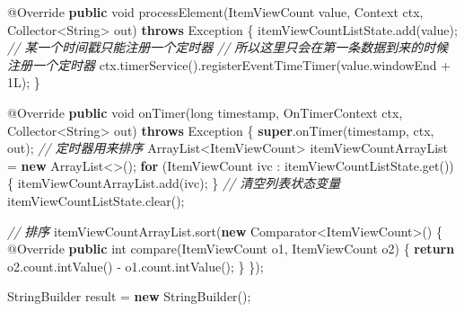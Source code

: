 \documentclass[cn,11pt,chinese]{elegantbook}
\newenvironment{Shaded}{}{}
\newcommand{\AttributeTok}[1]{\textcolor[rgb]{0.49,0.56,0.16}{#1}}
\newcommand{\BuiltInTok}[1]{#1}
\newcommand{\CommentTok}[1]{\textcolor[rgb]{0.38,0.63,0.69}{\textit{#1}}}
\newcommand{\DataTypeTok}[1]{\textcolor[rgb]{0.56,0.13,0.00}{#1}}
\newcommand{\DecValTok}[1]{\textcolor[rgb]{0.25,0.63,0.44}{#1}}
\newcommand{\FunctionTok}[1]{\textcolor[rgb]{0.02,0.16,0.49}{#1}}
\newcommand{\KeywordTok}[1]{\textcolor[rgb]{0.00,0.44,0.13}{\textbf{#1}}}
\newcommand{\NormalTok}[1]{#1}
\begin{document}
\begin{Shaded}
\begin{Highlighting}[]
        \AttributeTok{@Override}
        \KeywordTok{public} \DataTypeTok{void} \FunctionTok{processElement}\NormalTok{(ItemViewCount value, }\BuiltInTok{Context}\NormalTok{ ctx, Collector\textless{}}\BuiltInTok{String}\NormalTok{\textgreater{} out) }\KeywordTok{throws} \BuiltInTok{Exception}\NormalTok{ \{}
\NormalTok{            itemViewCountListState.}\FunctionTok{add}\NormalTok{(value);}
            \CommentTok{// 某一个时间戳只能注册一个定时器}
            \CommentTok{// 所以这里只会在第一条数据到来的时候注册一个定时器}
\NormalTok{            ctx.}\FunctionTok{timerService}\NormalTok{().}\FunctionTok{registerEventTimeTimer}\NormalTok{(value.}\FunctionTok{windowEnd}\NormalTok{ + }\DecValTok{1L}\NormalTok{);}
\NormalTok{        \}}

        \AttributeTok{@Override}
        \KeywordTok{public} \DataTypeTok{void} \FunctionTok{onTimer}\NormalTok{(}\DataTypeTok{long}\NormalTok{ timestamp, OnTimerContext ctx, Collector\textless{}}\BuiltInTok{String}\NormalTok{\textgreater{} out) }\KeywordTok{throws} \BuiltInTok{Exception}\NormalTok{ \{}
            \KeywordTok{super}\NormalTok{.}\FunctionTok{onTimer}\NormalTok{(timestamp, ctx, out);}
            \CommentTok{// 定时器用来排序}
            \BuiltInTok{ArrayList}\NormalTok{\textless{}ItemViewCount\textgreater{} itemViewCountArrayList = }\KeywordTok{new} \BuiltInTok{ArrayList}\NormalTok{\textless{}\textgreater{}();}
            \KeywordTok{for}\NormalTok{ (ItemViewCount ivc : itemViewCountListState.}\FunctionTok{get}\NormalTok{()) \{}
\NormalTok{                itemViewCountArrayList.}\FunctionTok{add}\NormalTok{(ivc);}
\NormalTok{            \}}
            \CommentTok{// 清空列表状态变量}
\NormalTok{            itemViewCountListState.}\FunctionTok{clear}\NormalTok{();}

            \CommentTok{// 排序}
\NormalTok{            itemViewCountArrayList.}\FunctionTok{sort}\NormalTok{(}\KeywordTok{new} \BuiltInTok{Comparator}\NormalTok{\textless{}ItemViewCount\textgreater{}() \{}
                \AttributeTok{@Override}
                \KeywordTok{public} \DataTypeTok{int} \FunctionTok{compare}\NormalTok{(ItemViewCount o1, ItemViewCount o2) \{}
                    \KeywordTok{return}\NormalTok{ o2.}\FunctionTok{count}\NormalTok{.}\FunctionTok{intValue}\NormalTok{() {-} o1.}\FunctionTok{count}\NormalTok{.}\FunctionTok{intValue}\NormalTok{();}
\NormalTok{                \}}
\NormalTok{            \});}

            \BuiltInTok{StringBuilder}\NormalTok{ result = }\KeywordTok{new} \BuiltInTok{StringBuilder}\NormalTok{();}


\end{Highlighting}
\end{Shaded}
\end{document}
